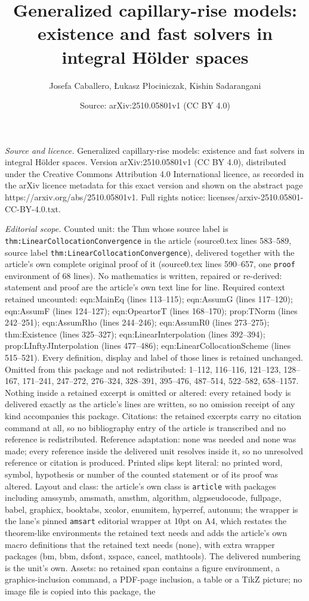 \documentclass[10pt,a4paper]{amsart}
\title[Generalized capillary-rise models: existence and fast solver]{Generalized capillary-rise models: existence and fast solvers in integral H\"older spaces}
\author{Josefa Caballero, {\L}ukasz P{\l}ociniczak, Kishin Sadarangani}
\date{Source: arXiv:2510.05801v1 (CC BY 4.0)}
\begin{document}
\maketitle

\noindent\emph{Source and licence.} Generalized capillary-rise models: existence and fast solvers in integral H\"older spaces. Version arXiv:2510.05801v1 (CC BY 4.0), distributed under the Creative Commons Attribution 4.0 International licence, as recorded in the arXiv licence metadata for this exact version and shown on the abstract page https://arxiv.org/abs/2510.05801v1. Full rights notice: licenses/arxiv-2510.05801-CC-BY-4.0.txt.\par\smallskip

\noindent\textit{Editorial scope.} Counted unit: the Thm whose source label is \texttt{thm:LinearCollocationConvergence} in the article (source0.tex lines 583--589, source label \texttt{thm:LinearCollocationConvergence}), delivered together with the article's own complete original proof of it (source0.tex lines 590--657, one \texttt{proof} environment of 68 lines). No mathematics is written, repaired or re-derived: statement and proof are the article's own text line for line. Required context retained uncounted: eqn:MainEq (lines 113--115); eqn:AssumG (lines 117--120); eqn:AssumF (lines 124--127); eqn:OpeartorT (lines 168--170); prop:TNorm (lines 242--251); eqn:AssumRho (lines 244--246); eqn:AssumR0 (lines 273--275); thm:Existence (lines 325--327); eqn:LinearInterpolation (lines 392--394); prop:LInftyJInterpolation (lines 477--486); eqn:LinearCollocationScheme (lines 515--521). Every definition, display and label of those lines is retained unchanged. Omitted from this package and not redistributed: 1--112, 116--116, 121--123, 128--167, 171--241, 247--272, 276--324, 328--391, 395--476, 487--514, 522--582, 658--1157. Nothing inside a retained excerpt is omitted or altered: every retained body is delivered exactly as the article's lines are written, so no omission receipt of any kind accompanies this package. Citations: the retained excerpts carry no citation command at all, so no bibliography entry of the article is transcribed and no reference is redistributed. Reference adaptation: none was needed and none was made; every reference inside the delivered unit resolves inside it, so no unresolved reference or citation is produced. Printed slips kept literal: no printed word, symbol, hypothesis or number of the counted statement or of its proof was altered. Layout and class: the article's own class is \texttt{article} with packages including amssymb, amsmath, amsthm, algorithm, algpseudocode, fullpage, babel, graphicx, booktabs, xcolor, enumitem, hyperref, autonum; the wrapper is the lane's pinned \texttt{amsart} editorial wrapper at 10pt on A4, which restates the theorem-like environments the retained text needs and adds the article's own macro definitions that the retained text needs (none), with extra wrapper packages (bm, bbm, dsfont, xspace, cancel, mathtools). The delivered numbering is the unit's own. Assets: no retained span contains a figure environment, a graphics-inclusion command, a PDF-page inclusion, a table or a TikZ picture; no image file is copied into this package, the 
\end{document}
